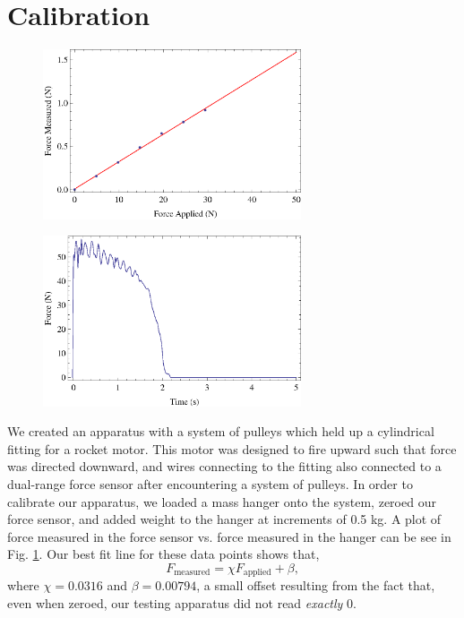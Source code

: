 \documentclass[aps,pra,twocolumn]{revtex4-1}
\begin{document}
\section{\label{section 3} Calibration}
\begin{figure} [t!]
	\includegraphics[width=3in]{calibration_Plot.eps}
	\caption{\label{calibrationPlot}}
\end{figure}
\begin{figure} [b!]
	\includegraphics[width=3in]{G38-scaledTest.eps}
	\caption{\label{thrustPlot}}
\end{figure}

We created an apparatus with a system of pulleys which held up a cylindrical fitting for a rocket motor.  This motor was designed to fire upward such that force was directed downward, and wires connecting to the fitting also connected to a dual-range force sensor after encountering a system of pulleys.  In order to calibrate our apparatus, we loaded a mass hanger onto the system, zeroed our force sensor, and added weight to the hanger at increments of 0.5 kg.  A plot of force measured in the force sensor vs. force measured in the hanger can be see in Fig. \ref{calibrationPlot}.  Our best fit line for these data points shows that,
\begin{equation}
F_\text{measured} = \chi F_\text{applied} + \beta ,
\end{equation}
where $\chi = 0.0316$ and $\beta = 0.00794$, a small offset resulting from the fact that, even when zeroed, our testing apparatus did not read \emph{exactly} 0.
\end{document}
